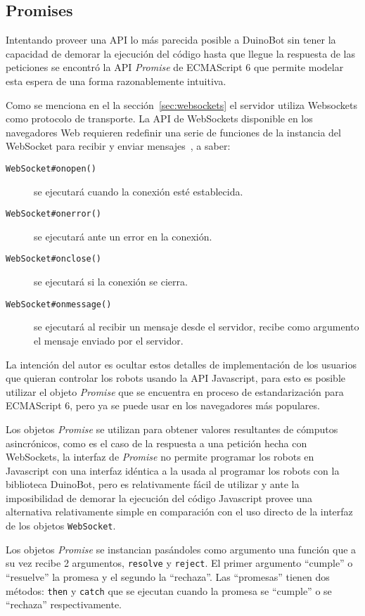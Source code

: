 \subsection{Promises}

Intentando proveer una API lo más parecida posible a DuinoBot sin
tener la capacidad de demorar la ejecución del código hasta que
llegue la respuesta de las peticiones se encontró la API
\textit{Promise} de ECMAScript 6 que permite modelar esta
espera de una forma razonablemente intuitiva.

Como se menciona en el la sección~\ref{sec:websockets} el servidor
utiliza Websockets como protocolo de transporte.
La API de WebSockets disponible en los navegadores Web requieren
redefinir una serie de funciones de la instancia del WebSocket
para recibir y enviar mensajes~\citep{websocket_2014}, a saber:
\begin{description}
    \item[\texttt{WebSocket\#onopen()}] se ejecutará cuando
    la conexión esté establecida.
    \item[\texttt{WebSocket\#onerror()}] se ejecutará ante un error en
    la conexión.
    \item[\texttt{WebSocket\#onclose()}] se ejecutará si la conexión
    se cierra.
    \item[\texttt{WebSocket\#onmessage()}] se ejecutará al recibir un
    mensaje desde el servidor, recibe como argumento el mensaje
    enviado por el servidor.
\end{description}

La intención del autor es ocultar estos detalles de implementación de
los usuarios que quieran controlar los robots usando la API Javascript,
para esto es posible utilizar el objeto \textit{Promise} que se encuentra
en proceso de estandarización para ECMAScript 6, pero ya se puede
usar en los navegadores más populares.

Los objetos \textit{Promise} se utilizan para obtener valores resultantes
de cómputos asincrónicos, como es el caso de la respuesta a una petición
hecha con WebSockets, la interfaz de \textit{Promise} no permite programar
los robots en Javascript con una interfaz idéntica a la usada al programar
los robots con la biblioteca DuinoBot, pero es relativamente fácil de
utilizar y ante la imposibilidad de demorar la ejecución del código
Javascript provee una alternativa
relativamente simple en comparación con el uso directo de la interfaz
de los objetos \texttt{WebSocket}.

Los objetos \textit{Promise} se instancian pasándoles como argumento una
función que a su vez recibe 2 argumentos, \texttt{resolve} y \texttt{reject}.
El primer argumento ``cumple'' o ``resuelve'' la promesa y el segundo la
``rechaza''.
Las ``promesas'' tienen dos métodos: \texttt{then} y \texttt{catch} que se
ejecutan cuando la promesa se ``cumple'' o se ``rechaza'' respectivamente.

